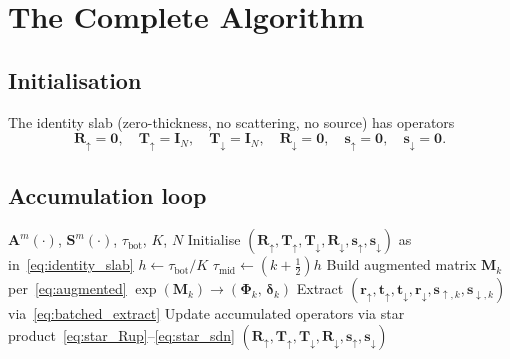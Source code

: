 \documentclass[11pt,a4paper]{article}
\newcommand{\vect}[1]{\bm{#1}}
\newcommand{\mat}[1]{\mathbf{#1}}
\newcommand{\tbot}{\tau_{\mathrm{bot}}}
\theoremstyle{definition}
\begin{document}
\section{The Complete Algorithm}\label{sec:algorithm}

\subsection{Initialisation}

The identity slab (zero-thickness, no scattering, no source) has
operators
\begin{equation}\label{eq:identity_slab}
  \mat{R}_\uparrow = \mat{0},\quad
  \mat{T}_\uparrow = \mat{I}_N,\quad
  \mat{T}_\downarrow = \mat{I}_N,\quad
  \mat{R}_\downarrow = \mat{0},\quad
  \vect{s}_\uparrow = \vect{0},\quad
  \vect{s}_\downarrow = \vect{0}.
\end{equation}

\subsection{Accumulation loop}

\begin{algorithm}[H]
\caption{Star-product Magnus accumulation}\label{alg:accumulation}
\begin{algorithmic}[1]
\Require $\mat{A}^m(\cdot)$, $\vect{S}^m(\cdot)$, $\tbot$, $K$, $N$
\State Initialise $(\mat{R}_\uparrow,\mat{T}_\uparrow,\mat{T}_\downarrow,
       \mat{R}_\downarrow,\vect{s}_\uparrow,\vect{s}_\downarrow)$
       as in~\eqref{eq:identity_slab}
\State $h \gets \tbot/K$
  \State $\tau_{\text{mid}} \gets (k+\tfrac{1}{2})h$
  \State Build augmented matrix $\mat{M}_k$ per~\eqref{eq:augmented}
  \State $\exp(\mat{M}_k) \to (\mat{\Phi}_k,\,\vect{\delta}_k)$
  \State Extract $(\mat{r}_\uparrow,\mat{t}_\uparrow,\mat{t}_\downarrow,
         \mat{r}_\downarrow,\vect{s}_{\uparrow,k},\vect{s}_{\downarrow,k})$
         via~\eqref{eq:batched_extract}
  \State Update accumulated operators via
         star product~\eqref{eq:star_Rup}--\eqref{eq:star_sdn}
\EndFor
\State \Return $(\mat{R}_\uparrow,\mat{T}_\uparrow,\mat{T}_\downarrow,
       \mat{R}_\downarrow,\vect{s}_\uparrow,\vect{s}_\downarrow)$
\end{algorithmic}
\end{algorithm}
\end{document}
